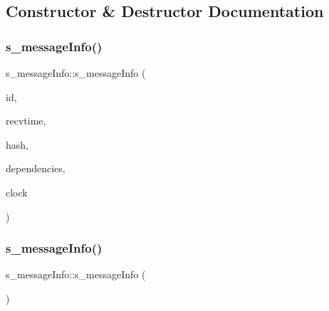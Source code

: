 \subsection{Constructor \& Destructor Documentation}
\mbox{\label{structs__message_info_aa626a79c3b41f14b406f8d86b87fcfb9}} 
\subsubsection{\texorpdfstring{s\+\_\+message\+Info()}{s\_messageInfo()}\hspace{0.1cm}{\footnotesize\ttfamily [1/2]}}
{\footnotesize\ttfamily s\+\_\+message\+Info\+::s\+\_\+message\+Info (\begin{DoxyParamCaption}\item[{\hyperlink{structures_8h_a83a1d9a070efa5341da84cfd8e28d3e5}{id\+Msg}}]{id,  }\item[{omnetpp\+::simtime\+\_\+t}]{recvtime,  }\item[{size\+\_\+t}]{hash,  }\item[{vector$<$ \hyperlink{structures_8h_a83a1d9a070efa5341da84cfd8e28d3e5}{id\+Msg} $>$}]{dependencies,  }\item[{\hyperlink{class_probabilistic_clock}{Probabilistic\+Clock}}]{clock }\end{DoxyParamCaption})\hspace{0.3cm}{\ttfamily [inline]}}

\mbox{\label{structs__message_info_a4cde6289906418221236646ae3df77c8}} 
\subsubsection{\texorpdfstring{s\+\_\+message\+Info()}{s\_messageInfo()}\hspace{0.1cm}{\footnotesize\ttfamily [2/2]}}
{\footnotesize\ttfamily s\+\_\+message\+Info\+::s\+\_\+message\+Info (\begin{DoxyParamCaption}{ }\end{DoxyParamCaption})\hspace{0.3cm}{\ttfamily [inline]}}



